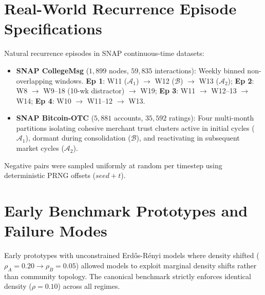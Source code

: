 \section{Real-World Recurrence Episode Specifications}
\label{app:real_world}

Natural recurrence episodes in SNAP continuous-time datasets:
\begin{itemize}
    \setlength{\itemsep}{0pt}
    \item \textbf{SNAP CollegeMsg} ($1,899$ nodes, $59,835$ interactions): Weekly binned non-overlapping windows. \textbf{Ep 1}: W11 ($\mathcal{A}_1$) $\to$ W12 ($\mathcal{B}$) $\to$ W13 ($\mathcal{A}_2$); \textbf{Ep 2}: W8 $\to$ W9--18 (10-wk distractor) $\to$ W19; \textbf{Ep 3}: W11 $\to$ W12--13 $\to$ W14; \textbf{Ep 4}: W10 $\to$ W11--12 $\to$ W13.
    \item \textbf{SNAP Bitcoin-OTC} ($5,881$ accounts, $35,592$ ratings): Four multi-month partitions isolating cohesive merchant trust clusters active in initial cycles ($\mathcal{A}_1$), dormant during consolidation ($\mathcal{B}$), and reactivating in subsequent market cycles ($\mathcal{A}_2$).
\end{itemize}
Negative pairs were sampled uniformly at random per timestep using deterministic PRNG offsets ($seed + t$).

\section{Early Benchmark Prototypes and Failure Modes}
\label{app:benchmark_history}

Early prototypes with unconstrained Erd\H{o}s-R\'enyi models where density shifted ($\rho_A = 0.20 \to \rho_B = 0.05$) allowed models to exploit marginal density shifts rather than community topology. The canonical benchmark strictly enforces identical density ($\rho = 0.10$) across all regimes.

